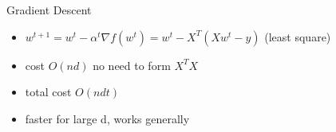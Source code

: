 \documentclass[1pt,letter]{article}
\def\items#1{\begin{itemize}[noitemsep,topsep=0pt,parsep=0pt,partopsep=0pt]#1\end{itemize}}
\begin{document}
\begin{minipage}{0.45\textwidth}
{{            }
            Gradient Descent
            \items{
                \item $w^{t+1} = w^t - \alpha^t \nabla f(w^t) = w^t -  X^T(Xw^t-y)$ (least square)
                \item cost $O(nd)$ no need to form $X^TX$
                \item total cost $O(ndt)$
                \item faster for large d, works generally
            }
        \item
        \item
    }
    
\end{minipage}
\end{document}
